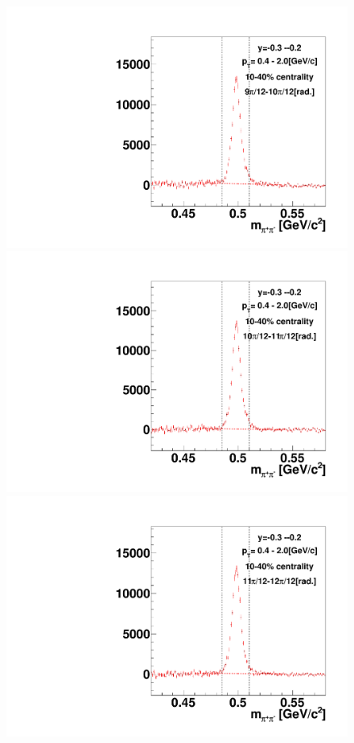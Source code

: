 \begin{figure}[h]
\includegraphics[width=0.14\linewidth]{chapterX/fig/ks_v1_sig/kf_ptslice0_cent1_ks_flow_phi10_rap7.pdf}
\includegraphics[width=0.14\linewidth]{chapterX/fig/ks_v1_sig/kf_ptslice0_cent1_ks_flow_phi11_rap7.pdf}
\includegraphics[width=0.14\linewidth]{chapterX/fig/ks_v1_sig/kf_ptslice0_cent1_ks_flow_phi12_rap7.pdf}


\end{figure}

